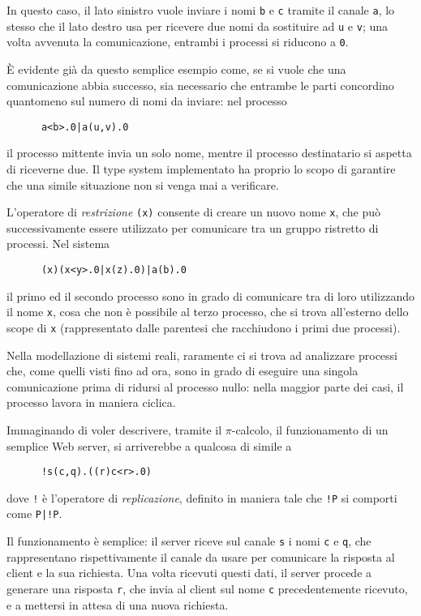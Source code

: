 In questo caso, il lato sinistro vuole inviare i nomi \verb.b. e \verb.c.
tramite il canale \verb.a., lo stesso che il lato destro usa per ricevere
due nomi da sostituire ad \verb.u. e \verb.v.; una volta avvenuta la
comunicazione, entrambi i processi si riducono a \verb.0..

\`E evidente gi\`a da questo semplice esempio come, se si vuole che una
comunicazione abbia successo, sia necessario che entrambe le parti
concordino quantomeno sul numero di nomi da inviare: nel processo

\begin{verbatim}
      a<b>.0|a(u,v).0
\end{verbatim}

il processo mittente invia un solo nome, mentre il processo destinatario
si aspetta di riceverne due. Il type system implementato ha proprio lo
scopo di garantire che una simile situazione non si venga mai a verificare.

L'operatore di \emph{restrizione} \verb.(x). consente di creare un nuovo
nome \verb.x., che pu\`o successivamente essere utilizzato per comunicare
tra un gruppo ristretto di processi.
Nel sistema

\begin{verbatim}
      (x)(x<y>.0|x(z).0)|a(b).0
\end{verbatim}

il primo ed il secondo processo sono in grado di comunicare tra di loro
utilizzando il nome \verb.x., cosa che non \`e possibile al terzo processo,
che si trova all'esterno dello scope di \verb.x. (rappresentato dalle
parentesi che racchiudono i primi due processi).

Nella modellazione di sistemi reali, raramente ci si trova ad analizzare
processi che, come quelli visti fino ad ora, sono in grado di eseguire una
singola comunicazione prima di ridursi al processo nullo: nella maggior
parte dei casi, il processo lavora in maniera ciclica.

Immaginando di voler descrivere, tramite il $\pi$-calcolo, il funzionamento
di un semplice Web server, si arriverebbe a qualcosa di simile a

\begin{verbatim}
      !s(c,q).((r)c<r>.0)
\end{verbatim}

dove \verb.!. \`e l'operatore di \emph{replicazione}, definito in maniera
tale che \verb.!P. si comporti come \verb.P|!P..

Il funzionamento \`e semplice: il server riceve sul canale \verb.s. i nomi
\verb.c. e \verb.q., che rappresentano rispettivamente il canale da usare
per comunicare la risposta al client e la sua richiesta. Una volta ricevuti
questi dati, il server procede a generare una risposta \verb.r., che invia
al client sul nome \verb.c. precedentemente ricevuto, e a mettersi in attesa
di una nuova richiesta.
